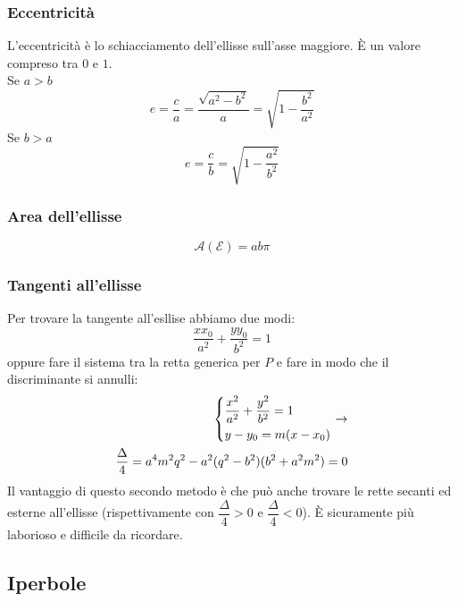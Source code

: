 \subsubsection{Eccentricità}
L'eccentricità è lo schiacciamento dell'ellisse sull'asse maggiore. È un valore compreso tra $0$ e 
$1$.\\
Se $a>b$
\begin{equation*}
e = \frac{c}{a} = \frac{\sqrt{a^2-b^2}}{a}=\sqrt{1-\frac{b^2}{a^2}}
\end{equation*}
Se $b>a$
\begin{equation*}
e = \frac{c}{b} = \sqrt{1-\frac{a^2}{b^2}}
\end{equation*}

\subsubsection{Area dell'ellisse}
\begin{equation*}
\mathscr{A}(\mathscr{E}) = ab\pi
\end{equation*}

\subsubsection{Tangenti all'ellisse}
Per trovare la tangente all'esllise abbiamo due modi:
\begin{equation*}
\frac{xx_0}{a^2}+\frac{yy_0}{b^2}=1
\end{equation*}
oppure fare il sistema tra la retta generica per $P$ e fare in modo che il discriminante si annulli:
\begin{align*}
\begin{dcases}
\frac{x^2}{a^2}+\frac{y^2}{b^2}=1\\
y-y_0=m(x-x_0)
\end{dcases}\rightarrow\\ \frac{\Delta}{4}=a^4m^2q^2-a^2(q^2-b^2)(b^2+a^2m^2) = 0
\end{align*}
Il vantaggio di questo secondo metodo è che può anche trovare le rette secanti ed esterne all'ellisse
(rispettivamente con $\dfrac{\Delta}{4}>0$ e $\dfrac{\Delta}{4}<0$). È sicuramente più laborioso e
difficile da ricordare.

\subsection{Iperbole}
\begin{center}
\end{center}

